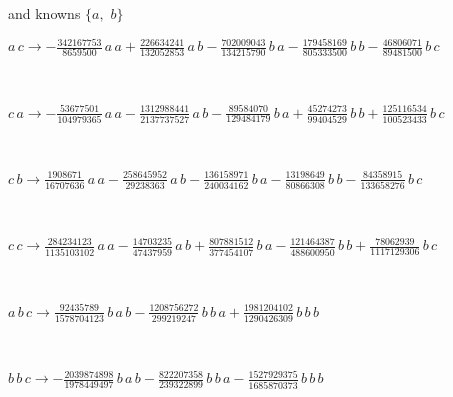 and knowns $\{a,
$ $
b\}$\smallskip\\
\begin{minipage}{6in}
$
a\,
 c\rightarrow -\frac{342167753}{8659500}\,
 a\,
 a + \frac{226634241}{132052853}\,
 a\,
 b - \frac{702009043}{134215790}\,
 b\,
 a - \frac{179458169}{805333500}\,
 b\,
 b - \frac{46806071}{89481500}\,
 b\,
 c
$
\end{minipage}\medskip \\
\begin{minipage}{6in}
$
c\,
 a\rightarrow -\frac{53677501}{104979365}\,
 a\,
 a - \frac{1312988441}{2137737527}\,
 a\,
 b - \frac{89584070}{129484179}\,
 b\,
 a + \frac{45274273}{99404529}\,
 b\,
 b + \frac{125116534}{100523433}\,
 b\,
 c
$
\end{minipage}\medskip \\
\begin{minipage}{6in}
$
c\,
 b\rightarrow \frac{1908671}{16707636}\,
 a\,
 a - \frac{258645952}{29238363}\,
 a\,
 b - \frac{136158971}{240034162}\,
 b\,
 a - \frac{13198649}{80866308}\,
 b\,
 b - \frac{84358915}{133658276}\,
 b\,
 c
$
\end{minipage}\medskip \\
\begin{minipage}{6in}
$
c\,
 c\rightarrow \frac{284234123}{1135103102}\,
 a\,
 a - \frac{14703235}{47437959}\,
 a\,
 b + \frac{807881512}{377454107}\,
 b\,
 a - \frac{121464387}{488600950}\,
 b\,
 b + \frac{78062939}{1117129306}\,
 b\,
 c
$
\end{minipage}\medskip \\
\begin{minipage}{6in}
$
a\,
 b\,
 c\rightarrow \frac{92435789}{1578704123}\,
 b\,
 a\,
 b - \frac{1208756272}{299219247}\,
 b\,
 b\,
 a + \frac{1981204102}{1290426309}\,
 b\,
 b\,
 b
$
\end{minipage}\medskip \\
\begin{minipage}{6in}
$
b\,
 b\,
 c\rightarrow -\frac{2039874898}{1978449497}\,
 b\,
 a\,
 b - \frac{822207358}{239322899}\,
 b\,
 b\,
 a - \frac{1527929375}{1685870373}\,
 b\,
 b\,
 b
$
\end{minipage}\\
\vspace{10pt}

